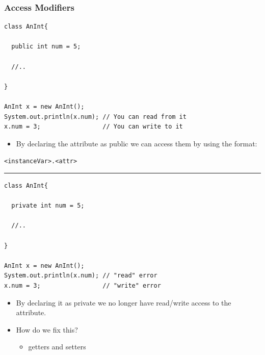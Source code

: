 \documentclass{beamer}
\begin{document}
\begin{frame}[fragile]
    \frametitle{Access Modifiers}
    \begin{minipage}{0.59\textwidth}
        \begin{lstlisting}[basicstyle=\tiny, frame=trBL]
class AnInt{
    
  public int num = 5;

  //..

}

AnInt x = new AnInt();
System.out.println(x.num); // You can read from it
x.num = 3;                 // You can write to it
        \end{lstlisting}
    \end{minipage}
    \begin{minipage}{0.39\textwidth}
        \scriptsize
        \begin{itemize}
            \item By declaring the attribute as public we can access them by using the format:
        \end{itemize}
        \begin{center}
            \lstinline|<instanceVar>.<attr>|
        \end{center}
    \end{minipage}
    \vfill
    \noindent\rule{\textwidth}{0.4pt}
    \vfill
    \begin{minipage}{0.59\textwidth}
        \begin{lstlisting}[basicstyle=\tiny, frame=trBL]
class AnInt{
    
  private int num = 5;

  //..

}

AnInt x = new AnInt();
System.out.println(x.num); // "read" error
x.num = 3;                 // "write" error
        \end{lstlisting}
    \end{minipage}
    \begin{minipage}{0.39\textwidth}
        \scriptsize
        \begin{itemize}
            \item By declaring it as private we no longer have read/write access to the attribute.
            \item How do we fix this?
            \begin{itemize}
                \item \scriptsize{getters and setters}
            \end{itemize}
        \end{itemize}
    \end{minipage}
\end{frame}
\end{document}
